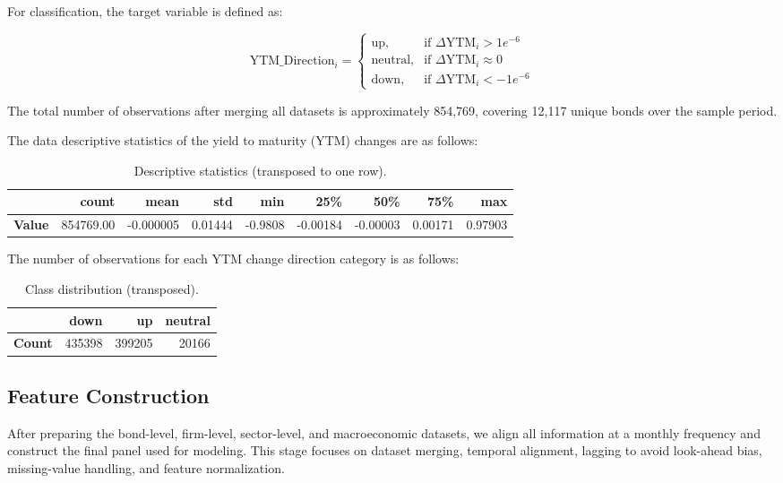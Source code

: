 \documentclass[12pt]{article}
\begin{document}
For classification, the target variable is defined as:

\begin{equation}
\text{YTM\_Direction}_i = 
\begin{cases}
\text{up}, & \text{if } \Delta \text{YTM}_i > 1e^{-6} \\
\text{neutral}, & \text{if } \Delta \text{YTM}_i \approx 0 \\
\text{down}, & \text{if } \Delta \text{YTM}_i < -1e^{-6}
\end{cases}
\end{equation}

The total number of observations after merging all datasets is approximately 854,769, covering 12,117 unique bonds over the sample period.

The data descriptive statistics of the yield to maturity (YTM) changes are as follows:



\begin{table}[H]
\centering
\begin{tabular}{lrrrrrrrr}
\hline
 & \textbf{count} & \textbf{mean} & \textbf{std} & \textbf{min} & \textbf{25\%} & \textbf{50\%} & \textbf{75\%} & \textbf{max} \\
\hline
\textbf{Value} &
854769.00 &
-0.000005 &
0.01444 &
-0.9808 &
-0.00184 &
-0.00003 &
0.00171 &
0.97903 \\
\hline
\end{tabular}
\caption{Descriptive statistics (transposed to one row).}
\end{table}

The number of observations for each YTM change direction category is as follows: 

\begin{table}[H]
\centering
\begin{tabular}{lrrr}
\hline
 & \textbf{down} & \textbf{up} & \textbf{neutral} \\
\hline
\textbf{Count} & 435398 & 399205 & 20166 \\
\hline
\end{tabular}
\caption{Class distribution (transposed).}
\end{table}

\subsection{Feature Construction}

After preparing the bond-level, firm-level, sector-level, and macroeconomic datasets, we align all information at a monthly frequency and construct the final panel used for modeling. This stage focuses on dataset merging, temporal alignment, lagging to avoid look-ahead bias, missing-value handling, and feature normalization.
\end{document}
